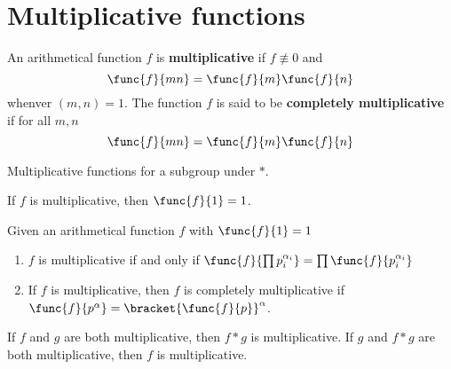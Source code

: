 \section{Multiplicative functions}
\begin{definition}
    An arithmetical function \(f\) is \textbf{multiplicative} if \(f \not\equiv 0\) and 
    \begin{equation*}
        \func{f}{mn} = \func{f}{m} \func{f}{n}
    \end{equation*}
    whenver \((m,n) = 1\). The function \(f\) is said to be \textbf{completely multiplicative} if for all \(m,n\)
    \begin{equation*}
        \func{f}{mn} = \func{f}{m} \func{f}{n}
    \end{equation*}
\end{definition}
\begin{remark}
    Multiplicative functions for a subgroup under \(\ast\).
\end{remark}
\begin{proposition}
    If \(f\) is multiplicative, then \(\func{f}{1} = 1\).
\end{proposition}
\begin{theorem}
    Given an arithmetical function \(f\) with \(\func{f}{1} = 1\)
    \begin{enumerate}
        \item  \(f\) is multiplicative if and only if \(\func{f}{\prod p_i^{\alpha_i}} = \prod \func{f}{p_i^{\alpha_i}}\)
        \item If \(f\) is multiplicative, then \(f\) is completely multiplicative if \(\func{f}{p^{\alpha}} = \bracket{\func{f}{p}}^{\alpha}\).
    \end{enumerate}
\end{theorem}
\begin{theorem}
    If \(f\) and \(g\) are both multiplicative, then \(f \ast g\) is multiplicative. If \(g\) and \(f \ast g\) are both multiplicative, then \(f\) is multiplicative.
\end{theorem}
